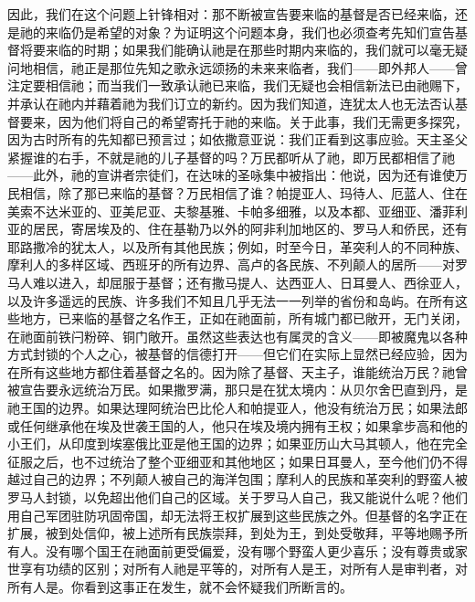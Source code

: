 因此，我们在这个问题上针锋相对：那不断被宣告要来临的基督是否已经来临，还是祂的来临仍是希望的对象？为证明这个问题本身，我们也必须查考先知们宣告基督将要来临的时期；如果我们能确认祂是在那些时期内来临的，我们就可以毫无疑问地相信，祂正是那位先知之歌永远颂扬的未来来临者，我们——即外邦人——曾注定要相信祂；而当我们一致承认祂已来临，我们无疑也会相信新法已由祂赐下，并承认在祂内并藉着祂为我们订立的新约。因为我们知道，连犹太人也无法否认基督要来，因为他们将自己的希望寄托于祂的来临。关于此事，我们无需更多探究，因为古时所有的先知都已预言过；如依撒意亚说：我们正看到这事应验。天主圣父紧握谁的右手，不就是祂的儿子基督的吗？万民都听从了祂，即万民都相信了祂——此外，祂的宣讲者宗徒们，在达味的圣咏集中被指出：他说，因为还有谁使万民相信，除了那已来临的基督？万民相信了谁？帕提亚人、玛待人、厄蓝人、住在美索不达米亚的、亚美尼亚、夫黎基雅、卡帕多细雅，以及本都、亚细亚、潘菲利亚的居民，寄居埃及的、住在基勒乃以外的阿非利加地区的、罗马人和侨民，还有耶路撒冷的犹太人，以及所有其他民族；例如，时至今日，革突利人的不同种族、摩利人的多样区域、西班牙的所有边界、高卢的各民族、不列颠人的居所——对罗马人难以进入，却屈服于基督；还有撒马提人、达西亚人、日耳曼人、西徐亚人，以及许多遥远的民族、许多我们不知且几乎无法一一列举的省份和岛屿。在所有这些地方，已来临的基督之名作王，正如在祂面前，所有城门都已敞开，无门关闭，在祂面前铁闩粉碎、铜门敞开。虽然这些表达也有属灵的含义——即被魔鬼以各种方式封锁的个人之心，被基督的信德打开——但它们在实际上显然已经应验，因为在所有这些地方都住着基督之名的。因为除了基督、天主子，谁能统治万民？祂曾被宣告要永远统治万民。如果撒罗满，那只是在犹太境内：从贝尔舍巴直到丹，是祂王国的边界。如果达理阿统治巴比伦人和帕提亚人，他没有统治万民；如果法郎或任何继承他在埃及世袭王国的人，他只在埃及境内拥有王权；如果拿步高和他的小王们，从印度到埃塞俄比亚是他王国的边界；如果亚历山大马其顿人，他在完全征服之后，也不过统治了整个亚细亚和其他地区；如果日耳曼人，至今他们仍不得越过自己的边界；不列颠人被自己的海洋包围；摩利人的民族和革突利的野蛮人被罗马人封锁，以免超出他们自己的区域。关于罗马人自己，我又能说什么呢？他们用自己军团驻防巩固帝国，却无法将王权扩展到这些民族之外。但基督的名字正在扩展，被到处信仰，被上述所有民族崇拜，到处为王，到处受敬拜，平等地赐予所有人。没有哪个国王在祂面前更受偏爱，没有哪个野蛮人更少喜乐；没有尊贵或家世享有功绩的区别；对所有人祂是平等的，对所有人是王，对所有人是审判者，对所有人是。你看到这事正在发生，就不会怀疑我们所断言的。\par

